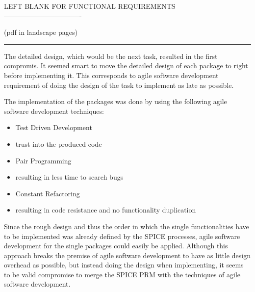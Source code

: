 {}

{}

{}

{LEFT BLANK FOR FUNCTIONAL
REQUIREMENTS----------------------------------}

{(pdf in landscape pages)}

\begin{center}\rule{0.5\linewidth}{\linethickness}\end{center}

{}

{}

{The detailed design, which would be the next task, resulted in the
first compromis. It seemed smart to move the detailed design of each
package to right before implementing it. This corresponds to agile
software development requirement of doing the design of the task to
implement as late as possible.}

{The implementation of the packages was done by using the following
agile software development techniques:}

\begin{itemize}
\tightlist
\item
  {Test Driven Development}
\end{itemize}

\begin{itemize}
\tightlist
\item
  {trust into the produced code}
\end{itemize}

\begin{itemize}
\tightlist
\item
  {Pair Programming}
\end{itemize}

\begin{itemize}
\tightlist
\item
  {resulting in less time to search bugs}
\end{itemize}

\begin{itemize}
\tightlist
\item
  {Constant Refactoring}
\end{itemize}

\begin{itemize}
\tightlist
\item
  {resulting in code resistance and no functionality duplication}
\end{itemize}

{Since the rough design and thus the order in which the single
functionalities have to be implemented was already defined by the SPICE
processes, agile software development for the single packages could
easily be applied. Although this approach breaks the premise of agile
software development to have as little design overhead as possible, but
instead doing the design when implementing, it seems to be valid
compromise to merge the SPICE PRM with the techniques of agile software
development. }

